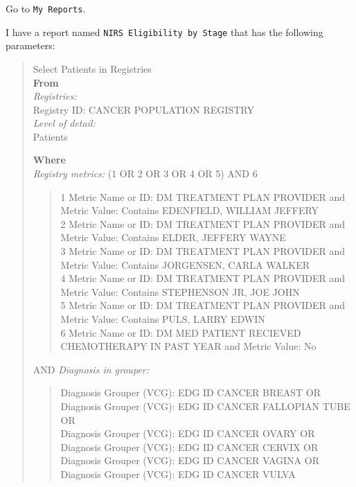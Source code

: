 \documentclass[
]{book}
\begin{document}
Go to \texttt{My\ Reports}.

I have a report named \texttt{NIRS\ Eligibility\ by\ Stage} that has the following parameters:

\begin{quote}
Select Patients in Registries\\
\textbf{From}\\
\emph{Registries:}\\
Registry ID: CANCER POPULATION REGISTRY\\
\emph{Level of detail:}\\
Patients

\textbf{Where}\\
\emph{Registry metrics:} (1 OR 2 OR 3 OR 4 OR 5) AND 6\\

\begin{quote}
1 Metric Name or ID: DM TREATMENT PLAN PROVIDER and Metric Value: Contains EDENFIELD, WILLIAM JEFFERY\\
2 Metric Name or ID: DM TREATMENT PLAN PROVIDER and Metric Value: Contains ELDER, JEFFERY WAYNE\\
3 Metric Name or ID: DM TREATMENT PLAN PROVIDER and Metric Value: Contains JORGENSEN, CARLA WALKER\\
4 Metric Name or ID: DM TREATMENT PLAN PROVIDER and Metric Value: Contains STEPHENSON JR, JOE JOHN\\
5 Metric Name or ID: DM TREATMENT PLAN PROVIDER and Metric Value: Contains PULS, LARRY EDWIN\\
6 Metric Name or ID: DM MED PATIENT RECIEVED CHEMOTHERAPY IN PAST YEAR and Metric Value: No\\
\end{quote}

AND \emph{Diagnosis in grouper:}\\

\begin{quote}
Diagnosis Grouper (VCG): EDG ID CANCER BREAST OR\\
Diagnosis Grouper (VCG): EDG ID CANCER FALLOPIAN TUBE OR\\
Diagnosis Grouper (VCG): EDG ID CANCER OVARY OR\\
Diagnosis Grouper (VCG): EDG ID CANCER CERVIX OR\\
Diagnosis Grouper (VCG): EDG ID CANCER VAGINA OR\\
Diagnosis Grouper (VCG): EDG ID CANCER VULVA\\
\end{quote}


\end{quote}
\end{document}
